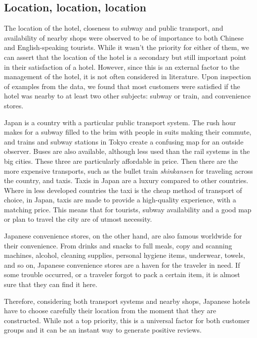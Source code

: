 \subsection{Location, location, location}\label{disc:location}

The location of the hotel, closeness to subway and public transport, and availability of nearby shops were observed to be of importance to both Chinese and English-speaking tourists. While it wasn't the priority for either of them, we can assert that the location of the hotel is a secondary but still important point in their satisfaction of a hotel. However, since this is an external factor to the management of the hotel, it is not often considered in literature. Upon inspection of examples from the data, we found that most customers were satisfied if the hotel was nearby to at least two other subjects: subway or train, and convenience stores. 

Japan is a country with a particular public transport system. The rush hour makes for a subway filled to the brim with people in suits making their commute, and trains and subway stations in Tokyo create a confusing map for an outside observer. Buses are also available, although less used than the rail systems in the big cities. These three are particularly affordable in price. Then there are the more expensive transports, such as the bullet train \textit{shinkansen} for traveling across the country, and taxis. Taxis in Japan are a luxury compared to other countries. Where in less developed countries the taxi is the cheap method of transport of choice, in Japan, taxis are made to provide a high-quality experience, with a matching price. This means that for tourists, subway availability and a good map or plan to travel the city are of utmost necessity.

Japanese convenience stores, on the other hand, are also famous worldwide for their convenience. From drinks and snacks to full meals, copy and scanning machines, alcohol, cleaning supplies, personal hygiene items, underwear, towels, and so on, Japanese convenience stores are a haven for the traveler in need. If some trouble occurred, or a traveler forgot to pack a certain item, it is almost sure that they can find it here.

Therefore, considering both transport systems and nearby shops, Japanese hotels have to choose carefully their location from the moment that they are constructed. While not a top priority, this is a universal factor for both customer groups and it can be an instant way to generate positive reviews.

